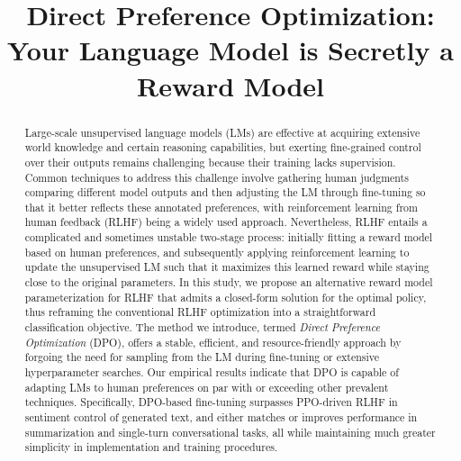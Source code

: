 \title{Direct Preference Optimization: Your Language Model is Secretly a Reward Model}

\begin{abstract}
Large-scale unsupervised language models (LMs) are effective at acquiring extensive world knowledge and certain reasoning capabilities, but exerting fine-grained control over their outputs remains challenging because their training lacks supervision. Common techniques to address this challenge involve gathering human judgments comparing different model outputs and then adjusting the LM through fine-tuning so that it better reflects these annotated preferences, with reinforcement learning from human feedback (RLHF) being a widely used approach. Nevertheless, RLHF entails a complicated and sometimes unstable two-stage process: initially fitting a reward model based on human preferences, and subsequently applying reinforcement learning to update the unsupervised LM such that it maximizes this learned reward while staying close to the original parameters. In this study, we propose an alternative reward model parameterization for RLHF that admits a closed-form solution for the optimal policy, thus reframing the conventional RLHF optimization into a straightforward classification objective. The method we introduce, termed \textit{Direct Preference Optimization} (DPO), offers a stable, efficient, and resource-friendly approach by forgoing the need for sampling from the LM during fine-tuning or extensive hyperparameter searches. Our empirical results indicate that DPO is capable of adapting LMs to human preferences on par with or exceeding other prevalent techniques. Specifically, DPO-based fine-tuning surpasses PPO-driven RLHF in sentiment control of generated text, and either matches or improves performance in summarization and single-turn conversational tasks, all while maintaining much greater simplicity in implementation and training procedures.
\end{abstract}

